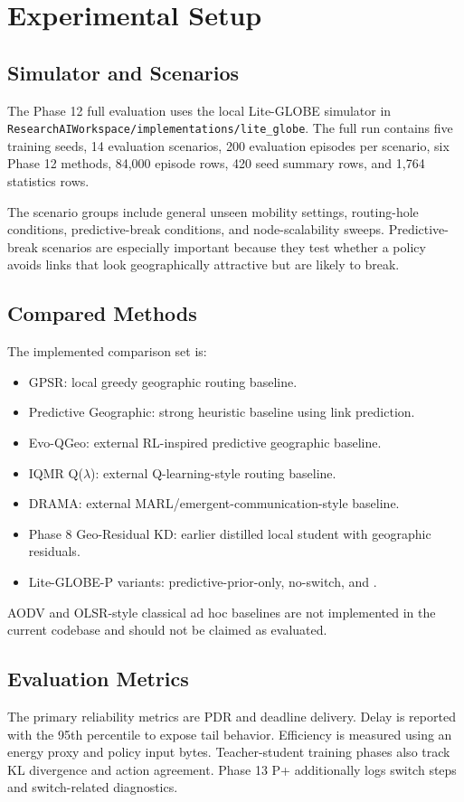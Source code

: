 \section{Experimental Setup}
\label{sec:setup}

\subsection{Simulator and Scenarios}
The Phase 12 full evaluation uses the local Lite-GLOBE simulator in \texttt{ResearchAIWorkspace/implementations/lite\_globe}. The full run contains five training seeds, 14 evaluation scenarios, 200 evaluation episodes per scenario, six Phase 12 methods, 84,000 episode rows, 420 seed summary rows, and 1,764 statistics rows.

The scenario groups include general unseen mobility settings, routing-hole conditions, predictive-break conditions, and node-scalability sweeps. Predictive-break scenarios are especially important because they test whether a policy avoids links that look geographically attractive but are likely to break.

\subsection{Compared Methods}
The implemented comparison set is:
\begin{itemize}
    \item GPSR: local greedy geographic routing baseline.
    \item Predictive Geographic: strong heuristic baseline using link prediction.
    \item Evo-QGeo: external RL-inspired predictive geographic baseline.
    \item IQMR Q($\lambda$): external Q-learning-style routing baseline.
    \item DRAMA: external MARL/emergent-communication-style baseline.
    \item Phase 8 Geo-Residual KD: earlier distilled local student with geographic residuals.
    \item Lite-GLOBE-P variants: predictive-prior-only, no-switch, and \phaseTwelve.
\end{itemize}

AODV and OLSR-style classical ad hoc baselines are not implemented in the current codebase and should not be claimed as evaluated.

\subsection{Evaluation Metrics}
The primary reliability metrics are PDR and deadline delivery. Delay is reported with the 95th percentile to expose tail behavior. Efficiency is measured using an energy proxy and policy input bytes. Teacher-student training phases also track KL divergence and action agreement. Phase 13 P+ additionally logs switch steps and switch-related diagnostics.

